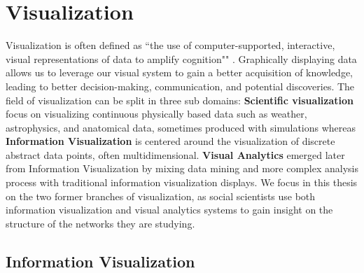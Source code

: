 \section{Visualization}

Visualization is often defined as ``the use of computer-supported, interactive, visual representations of data to amplify cognition"" \cite{cardReadingsInformationVisualization1999}.
Graphically displaying data allows us to leverage our visual system to gain a better acquisition of knowledge, leading to better decision-making, communication, and potential discoveries.
The field of visualization can be split in three sub domains: \textbf{Scientific visualization} focus on visualizing continuous physically based data such as weather, astrophysics, and anatomical data, sometimes produced with simulations whereas \textbf{Information Visualization} is centered around the visualization of discrete abstract data points, often multidimensional. \textbf{Visual Analytics} emerged later from Information Visualization by mixing data mining and more complex analysis process with traditional information visualization displays.
We focus in this thesis on the two former branches of visualization, as social scientists use both information visualization and visual analytics systems to gain insight on the structure of the networks they are studying.


\subsection{Information Visualization}

